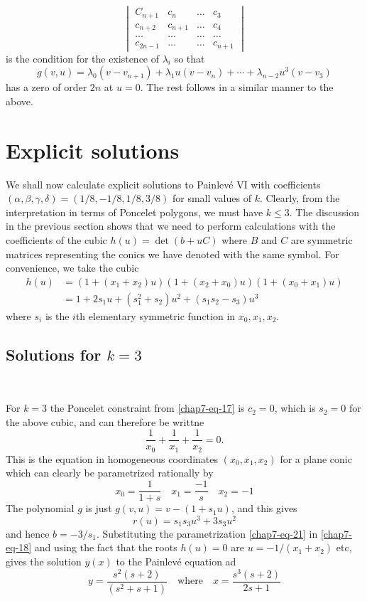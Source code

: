 $$
\begin{vmatrix}
C_{n+1} & c_{n} & \ldots  & c_{3}\\
c_{n+2} & c_{n+1} & \ldots & c_{4}\\
\ldots & \ldots & \ldots & \ldots\\
c_{2n-1} & \ldots &\ldots & c_{n+1}
\end{vmatrix}
$$
is the condition for the existence of $\lambda_{i}$ so that
$$
g(v,u) =\lambda_{0}(v-v_{n+1}) + \lambda_{1}u(v-v_{n}) + \cdots+\lambda_{n-2}u^{3}(v-v_{3})
$$
has a zero of order $2n$ at $u=0$. The rest follows in a similar manner to the above.

\section{Explicit solutions}\label{chap7-sec-6}

We shall now calculate explicit solutions to Painlev\'e VI with coefficients $(\alpha,\beta, \gamma, \delta)=(1/8,-1/8,1/8,3/8)$ for small values of $k$. Clearly, from the interpretation in terms of Poncelet polygons, we must have $k\leq 3$. The discussion in the previous section shows that we need to perform calculations with the coefficients of the cubic $h(u)=\det(b+uC)$ where $B$ and $C$ are symmetric matrices representing the conics we have denoted with the same symbol. For convenience, we take the cubic
\begin{align*}\label{chap7-eq-20}
h(u) &=(1+(x_{1}+x_{2})u)(1+(x_{2}+x_{0})u)(1+(x_{0}+x_{1})u)\nonumber\\
     &=1+2s_{1}u + (s_{1}^{2}+s_{2})u^{2} +(s_{1}s_{2}-s_{3})u^{3}\tag{20}
\end{align*}
where $s_{i}$ is the $i$th elementary symmetric function in $x_{0}, x_{1},x_{2}$. 

\subsection{Solutions for \boldmath$k=3$}\label{chap7-subsec-6.1}
~\pageoriginale

\smallskip
\noindent
For $k=3$ the Poncelet constraint from \eqref{chap7-eq-17} is $c_{2}=0$, which is $s_{2}=0$ for the above cubic, and can therefore be writtne
$$
\dfrac{1}{x_{0}}+\dfrac{1}{x_{1}} +\dfrac{1}{x_{2}}=0.
$$
This is the equation in homogeneous coordinates $(x_{0}, x_{1},x_{2})$ for a plane conic which can clearly be parametrized rationally by
\begin{equation*}\label{chap7-eq-21}
x_{0}=\dfrac{1}{1+s} \quad x_{1}=\dfrac{-1}{s} \quad x_{2}=-1\tag{21}
\end{equation*}
The polynomial $g$ is just $g(v,u) = v-(1+s_{1}u)$, and this gives
$$
r(u)=s_{1}s_{3}u^{3} +3s_{3}u^{2}
$$
and hence $b=-3/s_{1}$. Substituting the parametrization \eqref{chap7-eq-21} in \eqref{chap7-eq-18} and using the fact that the roots $h(u)=0$ are $u =-1/(x_{1}+x_{2})$ etc, gives the solution $y(x)$ to the Painlev\'e equation ad
$$
y = \dfrac{s^{2}(s+2)}{(s^{2}+s+1)} \quad \text{where} \quad x=\dfrac{s^{3}(s+2)}{2s+1}
$$

